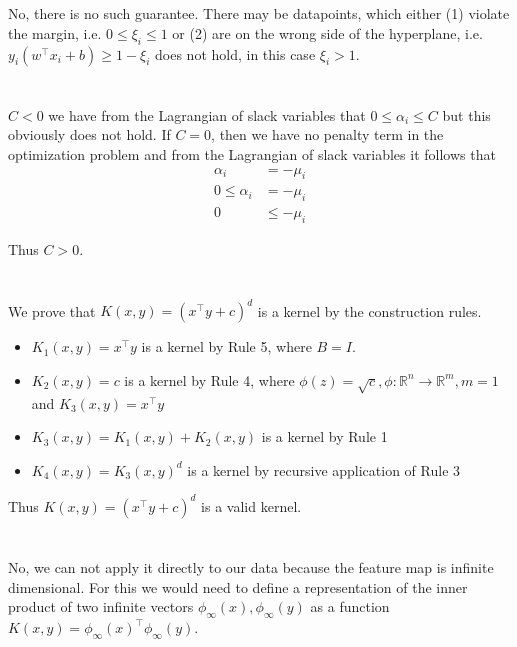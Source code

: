 \documentclass[11pt]{article}
\newcommand{\exercise}{\section{}}
\newcommand{\tf}[1]{{#1}^{\intercal}}
\begin{document}
\exercise

No, there is no such guarantee. There may be datapoints, which either (1) violate the margin, i.e. $0 \le \xi_i \le 1$ or (2) are on the wrong side of the hyperplane, i.e. $y_i (\tf{w} x_i + b) \ge 1 - \xi_i$ does not hold, in this case $\xi_i > 1$.

\exercise

$C < 0$ we have from the Lagrangian of slack variables that $0 \le \alpha_i \le C$ but this obviously does not hold. If $ C = 0$, then we have no penalty term in the optimization problem and from the Lagrangian of slack variables it follows that
\begin{align*}
\alpha_i &= - \mu_i \\
0 \le \alpha_i &= - \mu_i \\
0 &\le -\mu_i  \tag{violation of dual feasibility of Lagrangian multipliers $\mu_i \ge 0$ }
\end{align*}

\noindent Thus $C > 0$.

\exercise

We prove that $ K(x,y) = ( \tf{x} y + c)^d $ is a kernel by the construction rules.

\begin{itemize}
\item $K_1(x, y) = \tf{x} y$ is a kernel by Rule 5, where $B = I$.
\item $K_2(x, y) = c$ is a kernel by Rule 4, where $ \phi(z) = \sqrt{c}, \phi : \mathbb{R}^n \rightarrow \mathbb{R}^m, m = 1$ and $K_3(x, y) = \tf{x} y $
\item $K_3(x, y) = K_1(x, y) + K_2(x, y)$ is a kernel by Rule 1
\item $K_4(x, y) = K_3(x, y)^d$ is a kernel by recursive application of Rule 3
\end{itemize}

Thus $ K(x,y) = ( \tf{x} y + c)^d $ is a valid kernel.

\exercise

No, we can not apply it directly to our data because the feature map is infinite dimensional. For this we would need to define a representation of the inner product of two infinite vectors $\phi_\infty(x), \phi_\infty(y)$ as a function $K(x, y) = \tf{\phi_\infty(x)} \phi_\infty(y)$. 

\exercise
\end{document}
